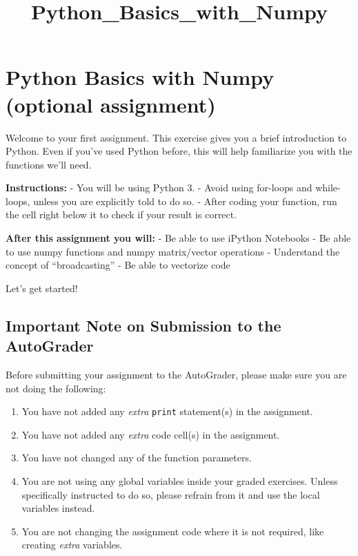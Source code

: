 \documentclass[11pt]{article}
\title{Python\_Basics\_with\_Numpy}
\providecommand{\tightlist}{%
      \setlength{\itemsep}{0pt}\setlength{\parskip}{0pt}}
\begin{document}
    
    \maketitle
    
    

    
    \hypertarget{python-basics-with-numpy-optional-assignment}{%
\section{Python Basics with Numpy (optional
assignment)}\label{python-basics-with-numpy-optional-assignment}}

Welcome to your first assignment. This exercise gives you a brief
introduction to Python. Even if you've used Python before, this will
help familiarize you with the functions we'll need.

\textbf{Instructions:} - You will be using Python 3. - Avoid using
for-loops and while-loops, unless you are explicitly told to do so. -
After coding your function, run the cell right below it to check if your
result is correct.

\textbf{After this assignment you will:} - Be able to use iPython
Notebooks - Be able to use numpy functions and numpy matrix/vector
operations - Understand the concept of ``broadcasting'' - Be able to
vectorize code

Let's get started!

\hypertarget{important-note-on-submission-to-the-autograder}{%
\subsection{Important Note on Submission to the
AutoGrader}\label{important-note-on-submission-to-the-autograder}}

Before submitting your assignment to the AutoGrader, please make sure
you are not doing the following:

\begin{enumerate}
\def\labelenumi{\arabic{enumi}.}
\tightlist
\item
  You have not added any \emph{extra} \texttt{print} statement(s) in the
  assignment.
\item
  You have not added any \emph{extra} code cell(s) in the assignment.
\item
  You have not changed any of the function parameters.
\item
  You are not using any global variables inside your graded exercises.
  Unless specifically instructed to do so, please refrain from it and
  use the local variables instead.
\item
  You are not changing the assignment code where it is not required,
  like creating \emph{extra} variables.
\end{enumerate}
\end{document}
